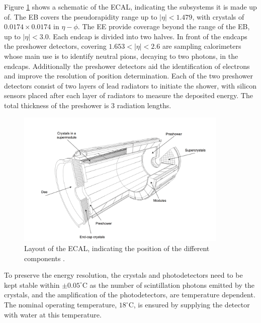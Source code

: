 Figure \ref{fig:CMS_ECAL} shows a schematic of the \ac{ECAL}, indicating
the subsystems it is made up of. The \ac{EB} 
covers the pseudorapidity range up to $|\eta|<1.479$, with
crystals of $0.0174 \times 0.0174$ in $\eta - \phi$. The \ac{EE}
provide coverage beyond the range of the \ac{EB}, up to $|\eta|<3.0$.
Each endcap is divided into two halves. In front of the endcaps 
the preshower detectors, covering $1.653<|\eta|<2.6$ are sampling
calorimeters whose main use is to identify neutral pions, decaying to two photons, 
in the endcaps. Additionally
the preshower detectors aid the identification of electrons and improve the resolution
of position determination. Each of the two preshower detectors consist
of two layers of lead radiators to initiate the shower, with silicon sensors
placed after each layer of radiators to measure the deposited energy. The 
total thickness of the preshower is 3 radiation lengths.

\begin{figure}[h!]
\begin{center}
\includegraphics[width=0.9\textwidth]{./Detector/Plots/ECAL.png}
\caption[Layout of the ECAL, indicating the positions
of the different components.]{Layout of the \ac{ECAL}, indicating the position of the
different components \cite{cms-jinst}.}
\label{fig:CMS_ECAL}
\end{center}
\end{figure}

To preserve the energy resolution, the crystals and
photodetectors need to be kept stable within $\pm 0.05^{\circ}$C
as the number of scintillation photons emitted by the crystals,
and the amplification of the photodetectors, are temperature dependent.
The nominal operating temperature, $18^{\circ}$C, is ensured by 
supplying the detector with water at this temperature.


